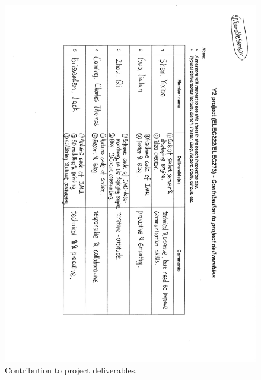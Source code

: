 \documentclass[12pt, a4paper]{report}
\begin{document}
\begin{figure}[htbp]
	\centering
	\includegraphics[width=\textwidth]{
		appendix/project-contribution}
	\caption{Contribution to project deliverables.}
	\label{fig:project-contribution}
\end{figure}
\end{document}
